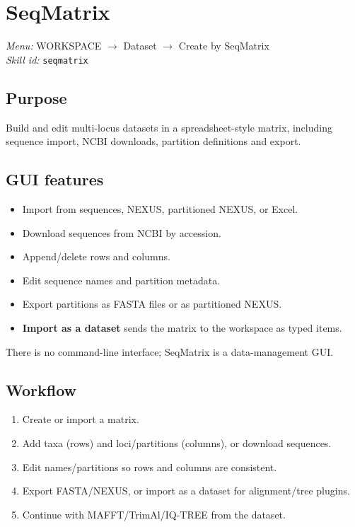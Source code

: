 \documentclass[11pt]{report}
\begin{document}
\section{SeqMatrix}
\noindent\textit{Menu:} WORKSPACE $\rightarrow$ Dataset $\rightarrow$ Create by SeqMatrix\\
\noindent\textit{Skill id:} \texttt{seqmatrix}

\subsection{Purpose}

Build and edit multi-locus datasets in a spreadsheet-style matrix, including sequence import, NCBI downloads, partition definitions and export.

\subsection{GUI features}

\begin{itemize}
  \item Import from sequences, NEXUS, partitioned NEXUS, or Excel.
  \item Download sequences from NCBI by accession.
  \item Append/delete rows and columns.
  \item Edit sequence names and partition metadata.
  \item Export partitions as FASTA files or as partitioned NEXUS.
  \item \textbf{Import as a dataset} sends the matrix to the workspace as typed items.
\end{itemize}

There is no command-line interface; SeqMatrix is a data-management GUI.

\subsection{Workflow}

\begin{enumerate}
  \item Create or import a matrix.
  \item Add taxa (rows) and loci/partitions (columns), or download sequences.
  \item Edit names/partitions so rows and columns are consistent.
  \item Export FASTA/NEXUS, or import as a dataset for alignment/tree plugins.
  \item Continue with MAFFT/TrimAl/IQ-TREE from the dataset.
\end{enumerate}
\end{document}

